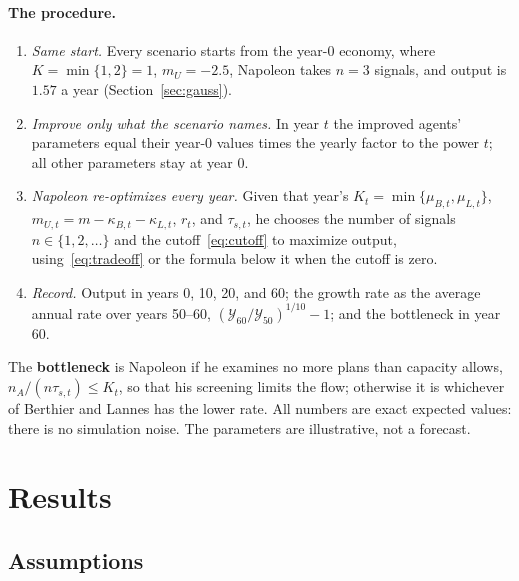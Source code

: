 \documentclass[11pt]{article}
\newcommand{\Nap}{\textcolor{nap}{Napoleon}}
\newcommand{\Ber}{\textcolor{ber}{Berthier}}
\newcommand{\Lan}{\textcolor{lan}{Lannes}}
\theoremstyle{remark}
\newcommand{\Ycal}{\mathcal{Y}}
\begin{document}
\paragraph{The procedure.}
\begin{enumerate}
  \item \emph{Same start.} Every scenario starts from the year-0 economy, where $K=\min\{1,2\}=1$, $m_U=-2.5$, \Nap{} takes $n=3$ signals, and output is $1.57$ a year (Section~\ref{sec:gauss}).
  \item \emph{Improve only what the scenario names.} In year $t$ the improved agents' parameters equal their year-0 values times the yearly factor to the power $t$; all other parameters stay at year 0.
  \item \emph{\Nap{} re-optimizes every year.} Given that year's $K_t=\min\{\mu_{B,t},\mu_{L,t}\}$, $m_{U,t}=m-\kappa_{B,t}-\kappa_{L,t}$, $r_t$, and $\tau_{s,t}$, he chooses the number of signals $n\in\{1,2,\dots\}$ and the cutoff~\eqref{eq:cutoff} to maximize output, using~\eqref{eq:tradeoff} or the formula below it when the cutoff is zero.
  \item \emph{Record.} Output in years 0, 10, 20, and 60; the growth rate as the average annual rate over years 50--60, $(\Ycal_{60}/\Ycal_{50})^{1/10}-1$; and the bottleneck in year 60.
\end{enumerate}
The \textbf{bottleneck} is \Nap{} if he examines no more plans than capacity allows, $n_A/(n\tau_{s,t})\le K_t$, so that his screening limits the flow; otherwise it is whichever of \Ber{} and \Lan{} has the lower rate. All numbers are exact expected values: there is no simulation noise. The parameters are illustrative, not a forecast.

\section{Results}\label{sec:results}

\subsection{Assumptions}
\end{document}
